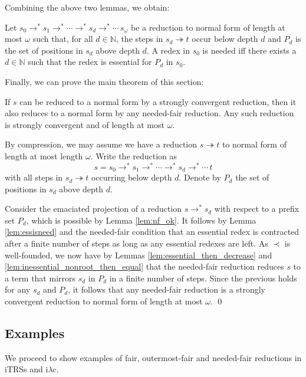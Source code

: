 \documentclass{LMCS}
\theoremstyle{definition}
\newcommand{\rewt}{\rightarrow^*}
\newcommand{\trewt}{\twoheadrightarrow}
\newcommand{\natnum}{\mathbb{N}}
\newcommand{\iLC}{i$\lambda$c\xspace}
\begin{document}
Combining the above two lemmas, we obtain:
\begin{lem}
\label{lem:essisneed}
Let $s_0 \rewt s_1 \rewt \cdots \rewt s_d \rewt \cdots \, s_\omega$ be a reduction to normal form of length at most $\omega$ such that, for all $d \in \natnum$, the steps in $s_d \trewt t$ occur below depth $d$ and $P_d$ is the set of positions in $s_d$ above depth $d$. A redex in $s_0$ is needed if{f} there exists a $d \in \natnum$ such that the redex is essential for $P_d$ in $s_0$.
\end{lem}

Finally, we can prove the main theorem of this section:
\begin{thm}
\label{thm:neededfair}
If $s$ can be reduced to a normal form by a strongly convergent reduction, then it also reduces to a normal form by any needed-fair reduction. Any such reduction is strongly convergent and of length at most $\omega$.
\end{thm}

\proof
By compression, we may assume we have a reduction $s \trewt t$ to normal form of length at most length $\omega$. Write the reduction as
\[
s = s_0 \rewt s_1 \rewt \cdots \rewt s_d \rewt \cdots \, t
\]
with all steps in $s_d \trewt t$ occurring below depth $d$. Denote by $P_d$ the set of positions in $s_d$ above depth $d$.

Consider the emaciated projection of a reduction $s \rewt s_d$ with respect to a prefix set $P_d$, which is possible by Lemma \ref{lem:nf_ok}. It follows by Lemma \ref{lem:essisneed} and the needed-fair condition that an essential redex is contracted after a finite number of steps as long as any essential redexes are left. As $\prec$ is well-founded, we now have by Lemmas \ref{lem:essential_then_decrease} and \ref{lem:inessential_nonroot_then_equal} that the needed-fair reduction reduces $s$ to a term that mirrors $s_d$ in $P_d$ in a finite number of steps. Since the previous holds for any $s_d$ and $P_d$, it follows that any needed-fair reduction is a strongly convergent reduction to normal form of length at most $\omega$.
\qed



\subsection{Examples}

We proceed to show examples of fair, outermost-fair and needed-fair reductions in iTRSs and \iLC.
\end{document}
